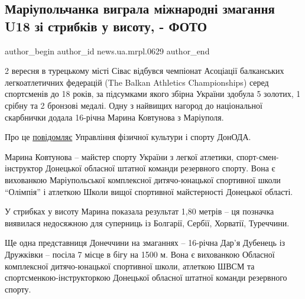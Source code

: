  
 
 
 
 
 
\subsection{Маріупольчанка виграла міжнародні змагання U18 зі стрибків у висоту, - ФОТО}
\label{sec:06_09_2023.stz.news.ua.mrpl.0629.1.mariupolchanka_vygrala_u18_zmagannja}
 
\ifcmt
 author_begin
   author_id news.ua.mrpl.0629
 author_end
\fi

\begin{qqquote}
2 вересня в турецькому місті Сівас відбувся чемпіонат Асоціації балканських
легкоатлетичних федерацій (The Balkan Athletics Championships) серед
спортсменів до 18 років, за підсумками якого збірна України здобула 5 золотих,
1 срібну та 2 бронзові медалі. Одну з найвищих нагород до національної
скарбнички додала 16-річна Марина Ковтунова з Маріуполя.
\end{qqquote}

Про це \href{https://sportdonoda.gov.ua/news/15014_mariupolchanka-marina-kovtunova-vigrala-mijnarodni-zmagannya-U18-zi-stribkiv-u-visotu.html}{повідомляє} Управління фізичної культури і спорту ДонОДА.

Марина Ковтунова – майстер спорту України з легкої атлетики,
спорт\hyp{}смен-інструктор Донецької обласної штатної команди резервного спорту. Вона
є вихованкою Маріупольської комплексної дитячо-юнацької спортивної школи
\enquote{Олімпія} і атлеткою Школи вищої спортивної майстерності Донецької області.

У стрибках у висоту Марина показала результат 1,80 метрів – ця позначка
виявилася недосяжною для суперниць із Болгарії, Сербії, Хорватії, Туреччини.


Ще одна представниця Донеччини на змаганнях – 16-річна Дар'я Дубенець із
Дружківки – посіла 7 місце в бігу на 1500 м. Вона є вихованкою Обласної
комплексної дитячо-юнацької спортивної школи, атлеткою ШВСМ та
спортсменкою-інструкторкою Донецької обласної штатної команди резервного
спорту.


